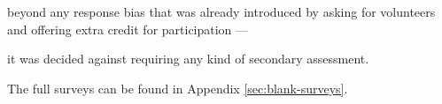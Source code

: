  beyond any response bias that was already introduced by asking for volunteers and offering extra credit for participation ---%







 it was decided against requiring any kind of secondary assessment. 















    The full surveys can be found in Appendix \ref{sec:blank-surveys}.























